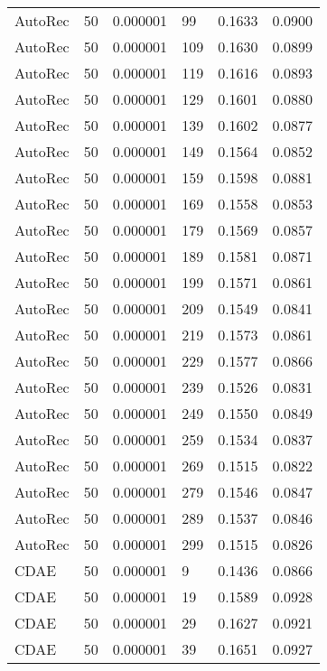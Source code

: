 \begin{tabular}{llrlrr}
 AutoRec &   50 &  0.000001 &    99 &  0.1633 &       0.0900 \\
 AutoRec &   50 &  0.000001 &   109 &  0.1630 &       0.0899 \\
 AutoRec &   50 &  0.000001 &   119 &  0.1616 &       0.0893 \\
 AutoRec &   50 &  0.000001 &   129 &  0.1601 &       0.0880 \\
 AutoRec &   50 &  0.000001 &   139 &  0.1602 &       0.0877 \\
 AutoRec &   50 &  0.000001 &   149 &  0.1564 &       0.0852 \\
 AutoRec &   50 &  0.000001 &   159 &  0.1598 &       0.0881 \\
 AutoRec &   50 &  0.000001 &   169 &  0.1558 &       0.0853 \\
 AutoRec &   50 &  0.000001 &   179 &  0.1569 &       0.0857 \\
 AutoRec &   50 &  0.000001 &   189 &  0.1581 &       0.0871 \\
 AutoRec &   50 &  0.000001 &   199 &  0.1571 &       0.0861 \\
 AutoRec &   50 &  0.000001 &   209 &  0.1549 &       0.0841 \\
 AutoRec &   50 &  0.000001 &   219 &  0.1573 &       0.0861 \\
 AutoRec &   50 &  0.000001 &   229 &  0.1577 &       0.0866 \\
 AutoRec &   50 &  0.000001 &   239 &  0.1526 &       0.0831 \\
 AutoRec &   50 &  0.000001 &   249 &  0.1550 &       0.0849 \\
 AutoRec &   50 &  0.000001 &   259 &  0.1534 &       0.0837 \\
 AutoRec &   50 &  0.000001 &   269 &  0.1515 &       0.0822 \\
 AutoRec &   50 &  0.000001 &   279 &  0.1546 &       0.0847 \\
 AutoRec &   50 &  0.000001 &   289 &  0.1537 &       0.0846 \\
 AutoRec &   50 &  0.000001 &   299 &  0.1515 &       0.0826 \\
    CDAE &   50 &  0.000001 &     9 &  0.1436 &       0.0866 \\
    CDAE &   50 &  0.000001 &    19 &  0.1589 &       0.0928 \\
    CDAE &   50 &  0.000001 &    29 &  0.1627 &       0.0921 \\
    CDAE &   50 &  0.000001 &    39 &  0.1651 &       0.0927 \\

\end{tabular}
